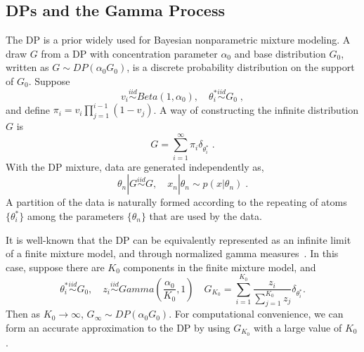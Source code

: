 \documentclass[runningheads,a4paper]{iscide}
\begin{document}
\subsection{DPs and the Gamma Process}
The DP is a prior widely used for Bayesian nonparametric mixture modeling.
A draw $G$ from a DP with concentration parameter $\alpha_0$ and
base distribution $G_0$, written as $G\sim DP(\alpha_0 G_0)$, is a discrete probability distribution on the support of $G_0$. Suppose
\begin{equation}
v_i \stackrel{iid}{\sim} Beta(1, \alpha_0), \quad \theta_i^*
\stackrel{iid}{\sim} G_0 \;,
\end{equation}
and define $\pi_i= v_i \prod_{j=1}^{i-1}(1-v_j)$. A way of constructing the infinite distribution $G$ is \cite{Sethuraman:ss94}
\begin{equation}
G=\sum_{i=1}^\infty \pi_i \delta_{\theta_i^*} \;.
\end{equation}
With the DP mixture, data are generated independently as,
\begin{equation}
\theta_n|G   \stackrel{iid}{\sim} G,\quad x_n|\theta_n \sim p(x|\theta_n) \;.
\end{equation}
A partition of the data is naturally formed according to the repeating of
atoms $\{\theta_i^*\}$ among the parameters $\{\theta_n\}$ that are used by the data.

It is well-known that the DP can be equivalently represented as an
infinite limit of a finite mixture
model, and through normalized gamma measures~\cite{Ferguson73DP,Ishwaran:2002a}. In this case, suppose there are $K_0$
components in the finite mixture model, and
$$ \theta_i^* \stackrel{iid}{\sim} G_0, \quad z_i \stackrel{iid}{\sim} Gamma(\textstyle\frac{\alpha_0}{K_0},1) \quad {G}_{K_0} = \sum_{i=1}^{K_0} \frac{z_i}{\sum_{j=1}^{K_0}z_j}
\delta_{\theta_i^*}.$$
Then as $K_0\rightarrow\infty$, ${G}_{\infty}\sim DP(\alpha_0 G_0)$. For computational convenience, we can form an accurate approximation to the DP by using $G_{K_0}$ with a large value of $K_0$ \cite{Ishwaran:2002a}.
\end{document}
